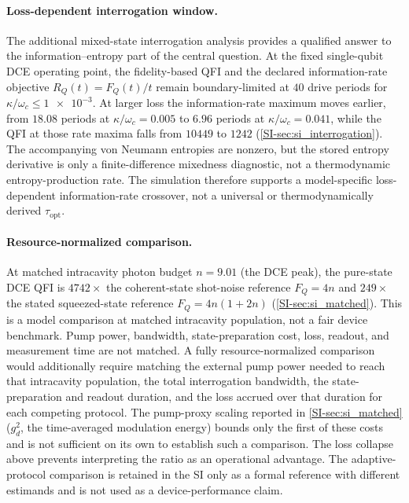 \documentclass[aps,prxquantum,preprint,superscriptaddress,amsmath,amssymb]{revtex4-2}
\begin{document}
\paragraph{Loss-dependent interrogation window.}
The additional mixed-state interrogation analysis provides a qualified answer to the information--entropy part of the central question. At the fixed single-qubit DCE operating point, the fidelity-based QFI and the declared information-rate objective $R_Q(t)=F_Q(t)/t$ remain boundary-limited at $\num{40}$ drive periods for $\kappa/\omega_c\le\num{1e-3}$. At larger loss the information-rate maximum moves earlier, from $\num{18.08}$ periods at $\kappa/\omega_c=\num{0.005}$ to $\num{6.96}$ periods at $\kappa/\omega_c=\num{0.041}$, while the QFI at those rate maxima falls from $\num{10449}$ to $\num{1242}$ (\cref{SI-sec:si_interrogation}). The accompanying von Neumann entropies are nonzero, but the stored entropy derivative is only a finite-difference mixedness diagnostic, not a thermodynamic entropy-production rate. The simulation therefore supports a model-specific loss-dependent information-rate crossover, not a universal or thermodynamically derived $\tau_{\mathrm{opt}}$.

\paragraph{Resource-normalized comparison.}
At matched intracavity photon budget $n = \num{9.01}$ (the DCE peak), the pure-state DCE QFI is $\num{4742}\times$ the coherent-state shot-noise reference $F_Q = 4 n$ and $\num{249}\times$ the stated squeezed-state reference $F_Q = 4 n (1+2 n)$ (\cref{SI-sec:si_matched}). This is a model comparison at matched intracavity population, not a fair device benchmark. Pump power, bandwidth, state-preparation cost, loss, readout, and measurement time are not matched. A fully resource-normalized comparison would additionally require matching the external pump power needed to reach that intracavity population, the total interrogation bandwidth, the state-preparation and readout duration, and the loss accrued over that duration for each competing protocol. The pump-proxy scaling reported in \cref{SI-sec:si_matched} ($g_d^2$, the time-averaged modulation energy) bounds only the first of these costs and is not sufficient on its own to establish such a comparison. The loss collapse above prevents interpreting the ratio as an operational advantage. The adaptive-protocol comparison is retained in the SI only as a formal reference with different estimands and is not used as a device-performance claim.
\end{document}
